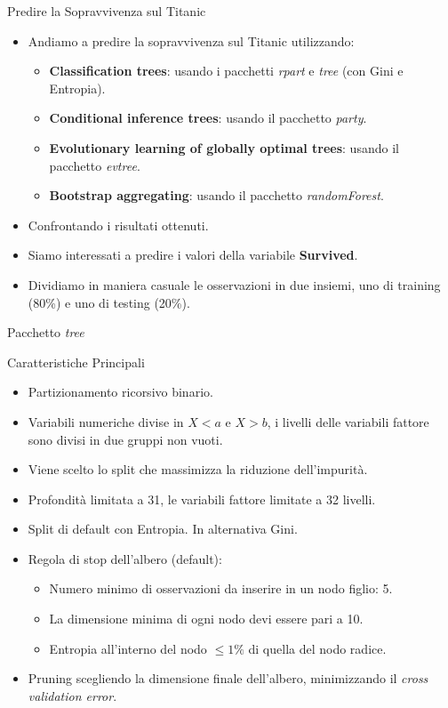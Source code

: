 \documentclass[9pt, xcolor=table]{beamer}
\begin{document}
	\begin{frame}{Predire la Sopravvivenza sul Titanic}		
		\begin{itemize}
			\item Andiamo a predire la sopravvivenza sul Titanic utilizzando:
			\begin{itemize}
				\item \textbf{Classification trees}: usando i pacchetti \textit{rpart} e \textit{tree} (con Gini e Entropia).
				\item \textbf{Conditional inference trees}: usando il pacchetto \textit{party}.
				\item \textbf{Evolutionary learning of globally optimal trees}: usando il
				pacchetto \textit{evtree}.
				\item \textbf{Bootstrap aggregating}: usando il
				pacchetto \textit{randomForest}.
			\end{itemize}
		\item Confrontando i risultati ottenuti.
		\item Siamo interessati a predire i valori della variabile \textbf{Survived}.
		\item Dividiamo in maniera casuale le osservazioni in due insiemi, uno di training (80\%) e uno di testing (20\%).
		
		
		\end{itemize}
	\end{frame}

	\begin{frame}{Pacchetto \textit{tree}}		
		\begin{block}{Caratteristiche Principali}
			\begin{itemize}
				\item Partizionamento ricorsivo binario.
				\item Variabili numeriche divise in $X<a$ e $X>b$, i livelli delle variabili fattore sono divisi in due gruppi non vuoti.
				\item Viene scelto lo split che massimizza la riduzione dell'impurità.
				\item Profondità limitata a 31, le variabili fattore limitate a 32 livelli.
				\item Split di default con Entropia. In	alternativa Gini.
				\item Regola di stop dell'albero (default): 
				\begin{itemize}
					\item Numero minimo di osservazioni da inserire in un nodo figlio: 5.
					\item La dimensione minima di ogni nodo devi essere pari a 10.
					\item Entropia all'interno del nodo $\leq 1\%$ di quella del nodo radice.
				\end{itemize}
				\item Pruning scegliendo la dimensione finale dell'albero, minimizzando il \textit{cross validation error}.
			\end{itemize}
		\end{block}
	\end{frame}
\end{document}
